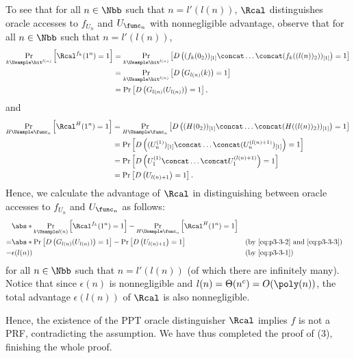 \begin{answer}[c]
    To see that for all $n\in\Nbb$ such that $n=l'(l(n))$, $\Rcal$ distinguishes oracle accesses to $f_{U_n}$ and $U_{\func_n}$ with nonnegligible advantage, observe that for all $n\in\Nbb$ such that $n=l'(l(n))$,
    \begin{align}\label{eq:p3-3-2}
        \Pr_{k\Usample\bit^{l(n)}}\left[ \Rcal^{f_k}(1^n)=1  \right]
        &= \Pr_{k\Usample\bit^{l(n)}}\left[ D\left( (f_k(0_2))_{[1]}\concat\ldots\concat(f_k((l(n))_2))_{[1]} \right)=1  \right] \notag\\
        &= \Pr_{k\Usample\bit^{l(n)}}\left[ D\left( G_{l(n)}(k) \right)=1  \right]\notag\\
        &= \Pr\left[ D\left( G_{l(n)}(U_{l(n)}) \right)=1  \right],
    \end{align}
    and
    \begin{align}\label{eq:p3-3-3}
        \Pr_{H\Usample\func_n}\left[ \Rcal^{H}(1^n)=1 \right]
        &= \Pr_{H\Usample\func_n}\left[ D\left( (H(0_2))_{[1]}\concat\ldots\concat(H((l(n))_2))_{[1]} \right)=1  \right]\notag\\
        &= \Pr\left[ D\left( (U_n^{(1)})_{[1]}\concat\ldots\concat(U_n^{(l(n)+1)})_{[1]} \right)=1  \right]\notag\\
        &= \Pr\left[ D\left( U_1^{(1)}\concat\ldots\concat U_1^{(l(n)+1)} \right)=1  \right]\notag\\
        &= \Pr\left[ D\left( U_{l(n)+1}\right)=1  \right].
    \end{align}
    Hence, we calculate the advantage of $\Rcal$ in distinguishing between oracle accesses to $f_{U_n}$ and $U_{\func_n}$ as follows:
    \begin{align*}
        &\abs*{\Pr_{k\Usample l(n)}\left[\Rcal^{f_k}(1^n)=1\right]-\Pr_{H\Usample \func_n}\left[\Rcal^{H}(1^n)=1\right]}\\
        =& \abs*{\Pr\left[ D\left( G_{l(n)}(U_{l(n)}) \right)=1  \right] - \Pr\left[ D\left( U_{l(n)+1}\right)=1  \right]}
        &&\textrm{(by \eqref{eq:p3-3-2} and \eqref{eq:p3-3-3})}\\
        =& \epsilon(l(n))
        &&\textrm{(by \eqref{eq:p3-3-1})}
    \end{align*}
    for all $n\in\Nbb$ such that $n=l'(l(n))$ (of which there are infinitely many).
    Notice that since $\epsilon(n)$ is nonnegligible and $l(n)=\Theta(n^c)=O(\poly(n))$, the total advantage $\epsilon(l(n))$ of $\Rcal$ is also nonnegligible. 

    Hence, the existence of the PPT oracle distinguisher $\Rcal$ implies $f$ is not a PRF, contradicting the assumption. We have thus completed the proof of (3), finishing the whole proof.
\end{answer}